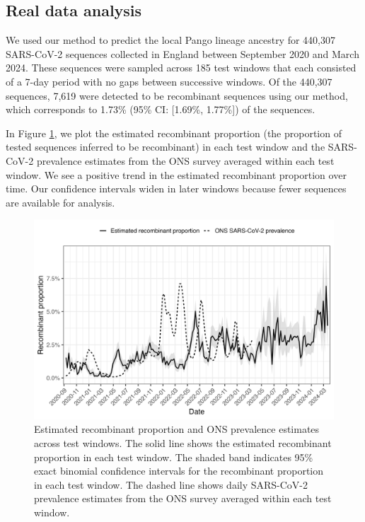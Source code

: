 \documentclass[11pt,oneside,letterpaper]{article}
\begin{document}
\subsection{Real data analysis} 

We used our method to predict the local Pango lineage ancestry for 440,307 SARS-CoV-2 sequences collected in England between September 2020 and March 2024. These sequences were sampled across 185 test windows that each consisted of a 7-day period with no gaps between successive windows. Of the 440,307 sequences, 7,619 were detected to be recombinant sequences using our method, which corresponds to 1.73\% (95\% CI: [1.69\%, 1.77\%]) of the sequences. 

In Figure \ref{fig:freq2}, we plot the estimated recombinant proportion (the proportion of tested sequences inferred to be recombinant) in each test window and the SARS-CoV-2 prevalence estimates from the ONS survey averaged within each test window. We see a positive trend in the estimated recombinant proportion over time. Our confidence intervals widen in later windows because fewer sequences are available for analysis.


\begin{figure}[H]
\centering
\includegraphics[width=\textwidth]{figures/hmm/line_plot.png}
\caption[Estimated recombinant proportion and ONS prevalence estimates]{Estimated recombinant proportion and ONS prevalence estimates across test windows. The solid line shows the estimated recombinant proportion in each test window. The shaded band indicates 95\% exact binomial confidence intervals for the recombinant proportion in each test window. The dashed line shows daily SARS-CoV-2 prevalence estimates from the ONS survey averaged within each test window.}
\label{fig:freq2}
\end{figure}
\end{document}
